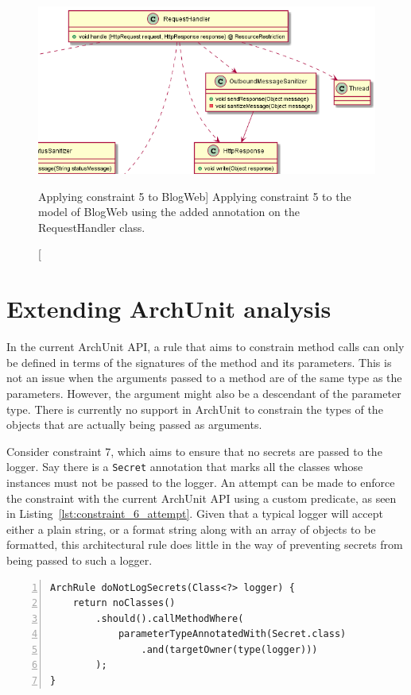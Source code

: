 \begin{figure}
    \centering
    \includegraphics[width=\linewidth]{figure/toyexamples/resource_restriction.png}
    \caption
        [Applying constraint 5 to BlogWeb]
        {Applying constraint 5 to the model of BlogWeb using the added annotation on the RequestHandler class.}
    \label{fig:toy_resource_restriction}
\end{figure}




\section{Extending ArchUnit analysis}

In the current ArchUnit API, a rule that aims to constrain method calls can only be defined in terms of the signatures of the method and its parameters. This is not an issue when the arguments passed to a method are of the same type as the parameters. However, the argument might also be a descendant of the parameter type. There is currently no support in ArchUnit to constrain the types of the objects that are actually being passed as arguments.

Consider constraint 7, which aims to ensure that no secrets are passed to the logger. Say there is a \texttt{Secret} annotation that marks all the classes whose instances must not be passed to the logger. An attempt can be made to enforce the constraint with the current ArchUnit API using a custom predicate, as seen in Listing~\ref{lst:constraint_6_attempt}. Given that a typical logger will accept either a plain string, or a format string along with an array of objects to be formatted, this architectural rule does little in the way of preventing secrets from being passed to such a logger.

\begin{minipage}{\linewidth}
\begin{lstlisting}[caption={A first attempt to implement constraint 7.}, captionpos=b, label=lst:constraint_6_attempt, numbers=left]
ArchRule doNotLogSecrets(Class<?> logger) {
    return noClasses()
        .should().callMethodWhere(
            parameterTypeAnnotatedWith(Secret.class)
                .and(targetOwner(type(logger)))
        );
}
\end{lstlisting}
\end{minipage}

